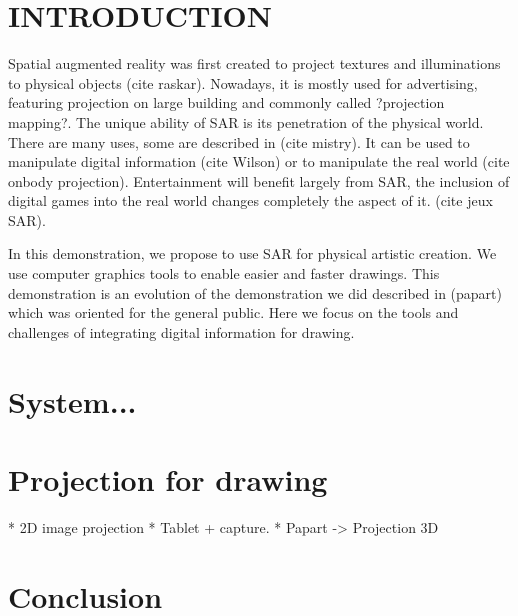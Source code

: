 \documentclass{article}
\begin{document}




\section{INTRODUCTION}

Spatial augmented reality was first created to project textures and illuminations to physical objects (cite raskar). Nowadays, it is mostly used for advertising, featuring projection on large building and commonly called ?projection mapping?. 
The unique ability of SAR is its penetration of the physical world. There are many uses, some are described in (cite mistry). It can be used to manipulate digital information (cite Wilson) or to manipulate the real world (cite onbody projection). Entertainment will benefit largely from SAR, the inclusion of digital games into the real world changes completely the aspect of it. (cite jeux SAR). 

In this demonstration, we propose to use SAR for physical artistic creation. We use computer graphics tools to enable easier and faster drawings. This demonstration is an evolution of the demonstration we did described in (papart) which was oriented for the general public. Here we focus on the tools and challenges of integrating digital information for drawing.  


\section{System... }


\section{Projection for drawing}
* 2D image projection
* Tablet + capture. 
* Papart -> Projection 3D

\section{Conclusion}
\end{document}
